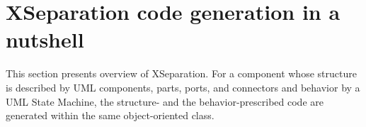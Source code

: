 \section{XSeparation code generation in a nutshell}
\label{sec:butshell}

This section presents overview of XSeparation.
For a component whose structure is described by UML components, parts, ports, and connectors and behavior by a UML State Machine, the structure- and the behavior-prescribed code are generated within the same object-oriented class. 

